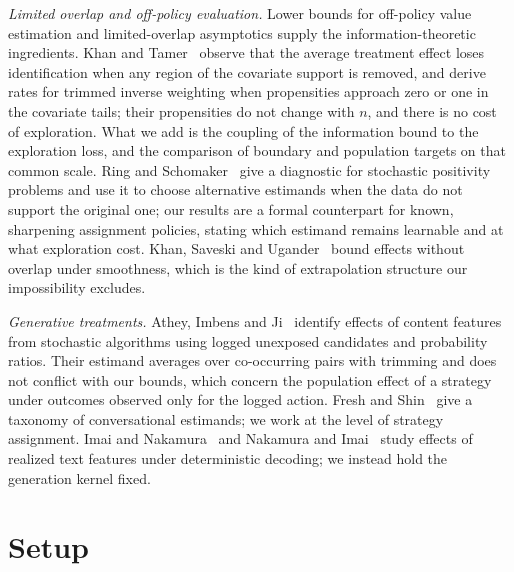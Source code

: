 \documentclass[12pt]{article}
\theoremstyle{definition}
\theoremstyle{remark}
\begin{document}
\emph{Limited overlap and off-policy evaluation.} Lower bounds for
off-policy value estimation \cite{li2015toward,wang2017optimal,mou2023off}
and limited-overlap asymptotics
\cite{khan2010irregular,hong2020inference,ma2020robust} supply the
information-theoretic ingredients. Khan and Tamer~\cite{khan2010irregular} observe that the
average treatment effect loses identification when any region of the
covariate support is removed, and derive rates for trimmed inverse weighting
when propensities approach zero or one in the covariate tails; their
propensities do not change with $n$, and there is no cost of exploration.
What we add is the coupling of the
information bound to the exploration loss, and the comparison of boundary and
population targets on that common scale. Ring and
Schomaker~\cite{ring2026diagnostic} give a diagnostic for stochastic positivity
problems and use it to choose alternative estimands when the data do not
support the original one; our results are a formal counterpart for known,
sharpening assignment policies, stating which estimand remains learnable and at
what exploration cost. Khan, Saveski and Ugander~\cite{khan2024off} bound effects
without overlap under smoothness, which is the kind of extrapolation structure
our impossibility excludes.

\emph{Generative treatments.} Athey, Imbens and Ji~\cite{athey2026stochastic} identify effects of
content features from stochastic algorithms using logged unexposed candidates
and probability ratios. Their estimand averages over co-occurring pairs with
trimming and does not conflict with our bounds, which concern the population
effect of a strategy under outcomes observed only for the logged action.
Fresh and Shin~\cite{fresh2026conversation} give a taxonomy of conversational estimands;
we work at the level of strategy assignment. Imai and Nakamura~\cite{imai2026causal} and
Nakamura and Imai~\cite{nakamura2026dynamic} study effects of realized text features under
deterministic decoding; we instead hold the generation kernel fixed.

\section{Setup}\label{sec:setup}
\end{document}
